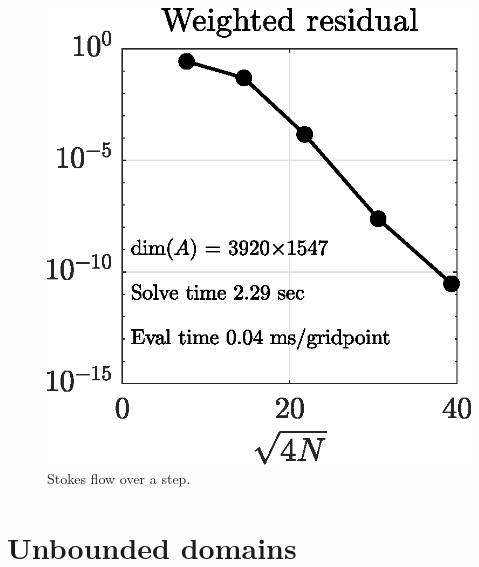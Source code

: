 \documentclass{article}
\begin{document}
\begin{example}
\begin{figure}[H]
	\vspace{2em}
	\includegraphics[width=0.4\linewidth]{Figures/step_conv}

	\caption{Stokes flow over a step.}
	\label{fig:step}
\end{figure} 
\end{example}

\section{Unbounded domains \label{sec:unbounded}}
\end{document}
